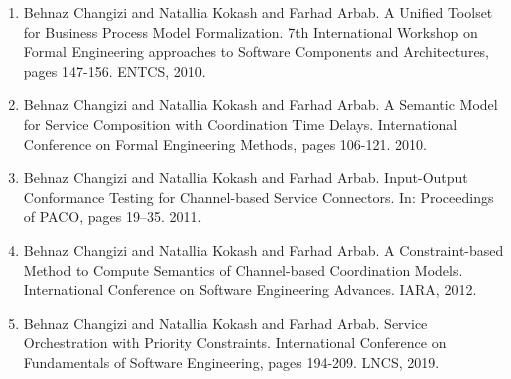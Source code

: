 \begin{enumerate}
\item
Behnaz Changizi and Natallia Kokash and Farhad Arbab. A Unified Toolset for Business Process Model Formalization. 7th International Workshop on Formal Engineering approaches to Software Components and Architectures,
 pages 147-156. ENTCS, 2010.

\item Behnaz Changizi and Natallia Kokash and Farhad Arbab. A Semantic Model for Service Composition with Coordination Time Delays. International Conference on Formal Engineering Methods, pages 106-121. 2010.

\item  Behnaz Changizi and Natallia Kokash and Farhad Arbab. Input-Output Conformance Testing for Channel-based Service Connectors. In: Proceedings of PACO, pages 19–35. 2011.

\item Behnaz Changizi and Natallia Kokash and Farhad Arbab. A Constraint-based Method to Compute Semantics of Channel-based Coordination Models. International Conference on Software Engineering Advances. IARA, 2012.

\item Behnaz Changizi and Natallia Kokash and Farhad Arbab. Service Orchestration with Priority Constraints. 
 International Conference on Fundamentals of Software Engineering, pages 194-209. LNCS, 2019.
\end{enumerate}
